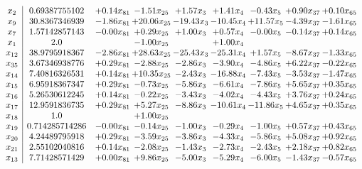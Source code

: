 \documentclass[8pt]{article}
\begin{document}
\[\begin{array}{c| c c@{\hskip 2pt} c@{\hskip 2pt} c@{\hskip 2pt} c@{\hskip 2pt} c@{\hskip 2pt} c@{\hskip 2pt} c@{\hskip 2pt} }
 x_{2}   &  0.69387755102 & +  0.14 x_{81} & -1.51 x_{25} & +  1.57 x_{3} & +  1.41 x_{4} & -0.43 x_{5} & +  0.90 x_{37} & +  0.10 x_{65}\\
 x_{9}   &  30.8367346939 & -1.86 x_{81} & + 20.06 x_{25} & -19.43 x_{3} & -10.45 x_{4} & + 11.57 x_{5} & -4.39 x_{37} & -1.61 x_{65}\\
 x_{7}   &  1.57142857143 & -0.00 x_{81} & +  0.29 x_{25} & +  1.00 x_{3} & +  0.57 x_{4} & -0.00 x_{5} & -0.14 x_{37} & +  0.14 x_{65}\\
 x_{1}   &  2.0  &   & -1.00 x_{25} &   & +  1.00 x_{4} &    &    &   \\
 x_{12}   &  38.9795918367 & -2.86 x_{81} & + 28.63 x_{25} & -25.43 x_{3} & -25.31 x_{4} & +  1.57 x_{5} & -8.67 x_{37} & -1.33 x_{65}\\
 x_{35}   &  3.67346938776 & +  0.29 x_{81} & -2.88 x_{25} & -2.86 x_{3} & -3.90 x_{4} & -4.86 x_{5} & +  6.22 x_{37} & -0.22 x_{65}\\
 x_{14}   &  7.40816326531 & +  0.14 x_{81} & + 10.35 x_{25} & -2.43 x_{3} & -16.88 x_{4} & -7.43 x_{5} & -3.53 x_{37} & -1.47 x_{65}\\
 x_{15}   &  6.95918367347 & +  0.29 x_{81} & -0.73 x_{25} & -5.86 x_{3} & -6.61 x_{4} & -7.86 x_{5} & +  5.65 x_{37} & +  0.35 x_{65}\\
 x_{16}   &  5.26530612245 & +  0.14 x_{81} & -0.22 x_{25} & -3.43 x_{3} & -4.02 x_{4} & -4.43 x_{5} & +  3.76 x_{37} & +  0.24 x_{65}\\
 x_{17}   &  12.9591836735 & +  0.29 x_{81} & +  5.27 x_{25} & -8.86 x_{3} & -10.61 x_{4} & -11.86 x_{5} & +  4.65 x_{37} & +  0.35 x_{65}\\
 x_{18}   &  1.0  &   & +  1.00 x_{25} &    &    &    &    &   \\
 x_{19}   &  0.714285714286 & -0.00 x_{81} & -0.14 x_{25} & -1.00 x_{3} & -0.29 x_{4} & -1.00 x_{5} & +  0.57 x_{37} & +  0.43 x_{65}\\
 x_{20}   &  4.24489795918 & +  0.29 x_{81} & -3.59 x_{25} & -3.86 x_{3} & -4.33 x_{4} & -5.86 x_{5} & +  5.08 x_{37} & +  0.92 x_{65}\\
 x_{21}   &  2.55102040816 & +  0.14 x_{81} & -2.08 x_{25} & -1.43 x_{3} & -2.73 x_{4} & -2.43 x_{5} & +  2.18 x_{37} & +  0.82 x_{65}\\
 x_{13}   &  7.71428571429 & +  0.00 x_{81} & +  9.86 x_{25} & -5.00 x_{3} & -5.29 x_{4} & -6.00 x_{5} & -1.43 x_{37} & -0.57 x_{65}\\

\end{array}\]
\end{document}
